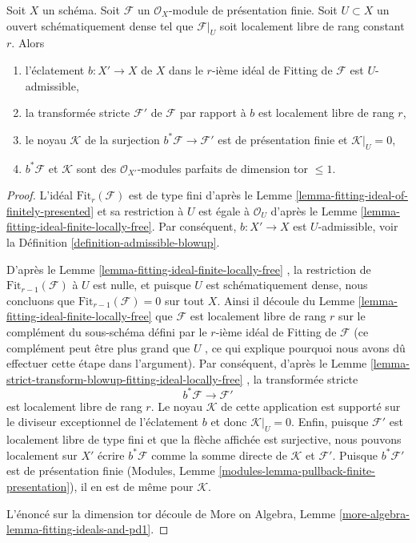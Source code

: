 \begin{lemma}
\label{lemma-blowup-fitting-ideal}
Soit  $X$  un schéma. Soit  $\mathcal{F}$  un  $\mathcal{O}_X$-module de
présentation finie. Soit  $U \subset X$  un ouvert schématiquement dense tel que
 $\mathcal{F}|_U$  soit localement libre de rang constant  $r$. Alors
\begin{enumerate}
\item l'éclatement  $b : X' \to X$  de  $X$  dans le  $r$-ième idéal de
Fitting de  $\mathcal{F}$  est  $U$-admissible,
\item la transformée stricte  $\mathcal{F}'$  de  $\mathcal{F}$  par rapport à  $b$  est
localement libre de rang  $r$,
\item le noyau  $\mathcal{K}$  de la surjection  $b^*\mathcal{F} \to \mathcal{F}'$  est de présentation finie et
 $\mathcal{K}|_U = 0$,
\item $b^*\mathcal{F}$  et  $\mathcal{K}$  sont des  $\mathcal{O}_{X'}$-modules parfaits de dimension
tor  $\leq 1$.
\end{enumerate}
\end{lemma}

\begin{proof}
L'idéal  $\text{Fit}_r(\mathcal{F})$  est de type fini d'après le Lemme  \ref{lemma-fitting-ideal-of-finitely-presented}  et sa
restriction à  $U$  est égale à  $\mathcal{O}_U$  d'après le Lemme  \ref{lemma-fitting-ideal-finite-locally-free}.
Par conséquent,  $b : X' \to X$  est  $U$-admissible, voir la Définition
 \ref{definition-admissible-blowup}.

\medskip\noindent
D'après le Lemme  \ref{lemma-fitting-ideal-finite-locally-free} , la restriction de  $\text{Fit}_{r - 1}(\mathcal{F})$  à  $U$  est
nulle, et puisque  $U$  est schématiquement dense, nous concluons que
 $\text{Fit}_{r - 1}(\mathcal{F}) = 0$  sur tout  $X$. Ainsi il découle du Lemme  \ref{lemma-fitting-ideal-finite-locally-free}  que
 $\mathcal{F}$  est localement libre de rang  $r$  sur le complément du
sous-schéma défini par le  $r$-ième idéal de Fitting de  $\mathcal{F}$  (ce
complément peut être plus grand que  $U$ , ce qui explique pourquoi nous
avons dû effectuer cette étape dans l'argument). Par conséquent, d'après le Lemme
 \ref{lemma-strict-transform-blowup-fitting-ideal-locally-free} , la transformée stricte
$$
b^*\mathcal{F} \longrightarrow \mathcal{F}'
$$
est localement libre de rang  $r$. Le noyau  $\mathcal{K}$  de cette
application est supporté sur le diviseur exceptionnel de l'éclatement  $b$ 
et donc  $\mathcal{K}|_U = 0$. Enfin, puisque  $\mathcal{F}'$  est localement libre de type
fini et que la flèche affichée est surjective, nous pouvons localement sur
 $X'$  écrire  $b^*\mathcal{F}$  comme la somme directe de  $\mathcal{K}$  et
 $\mathcal{F}'$. Puisque  $b^*\mathcal{F}'$  est de présentation finie (Modules, Lemme
 \ref{modules-lemma-pullback-finite-presentation}), il en est de même pour  $\mathcal{K}$.

\medskip\noindent
L'énoncé sur la dimension tor découle de More on Algebra, Lemme  \ref{more-algebra-lemma-fitting-ideals-and-pd1}.
\end{proof}





